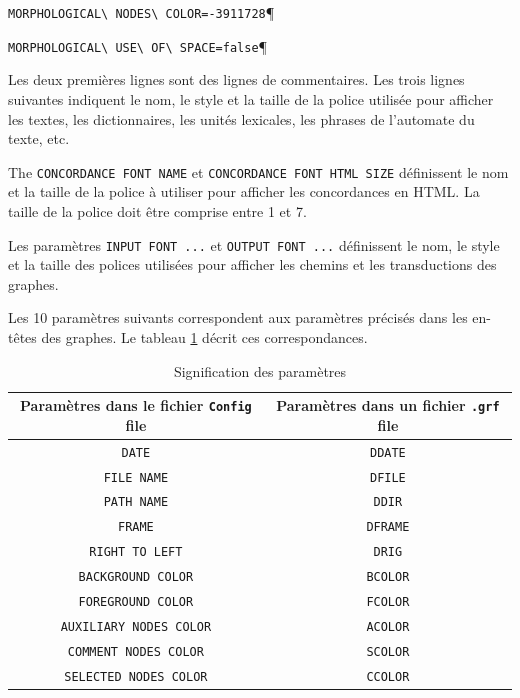 \verb$MORPHOLOGICAL\ NODES\ COLOR=-3911728$\P

\verb$MORPHOLOGICAL\ USE\ OF\ SPACE=false$\P


\bigskip
\noindent Les deux premières lignes sont des lignes de commentaires. Les trois lignes suivantes
indiquent le nom, le style et la taille de la police utilisée pour afficher les textes, les
dictionnaires, les unités lexicales, les phrases de l’automate du texte, etc.


\bigskip
\noindent The \verb$CONCORDANCE FONT NAME$ et \verb$CONCORDANCE FONT HTML SIZE$ définissent le nom et la taille de la police à utiliser pour afficher les concordances en HTML. La taille de la police doit être comprise entre 1 et 7.



\bigskip
\noindent Les paramètres \verb$INPUT FONT ...$ et \verb$OUTPUT FONT ...$ définissent le nom, le
style et la taille des polices utilisées pour afficher les chemins et les transductions des graphes.



\bigskip
\noindent Les 10 paramètres suivants correspondent aux paramètres précisés dans les en-têtes des
graphes. Le tableau \ref{tab-parameters} décrit ces correspondances.

\begin{table}[!ht]
\begin{center}
\begin{tabular}{|c|c|}
\hline
Paramètres dans le fichier \verb+Config+ file & Paramètres dans un fichier \verb+.grf+ file
\\
\hline
\verb$DATE$ & \verb$DDATE$
\\
\hline
\verb$FILE NAME$ & \verb$DFILE$
\\
\hline
\verb$PATH NAME$ & \verb$DDIR$
\\
\hline
\verb$FRAME$ & \verb$DFRAME$
\\
\hline
\verb$RIGHT TO LEFT$ & \verb$DRIG$
\\
\hline
\verb$BACKGROUND COLOR$ & \verb$BCOLOR$
\\
\hline
\verb$FOREGROUND COLOR$ & \verb$FCOLOR$
\\
\hline
\verb$AUXILIARY NODES COLOR$ & \verb$ACOLOR$
\\
\hline
\verb$COMMENT NODES COLOR$ & \verb$SCOLOR$
\\
\hline
\verb$SELECTED NODES COLOR$ & \verb$CCOLOR$
\\
\hline
\end{tabular}
\caption{Signification des paramètres\label{tab-parameters}}
\end{center}
\end{table}

